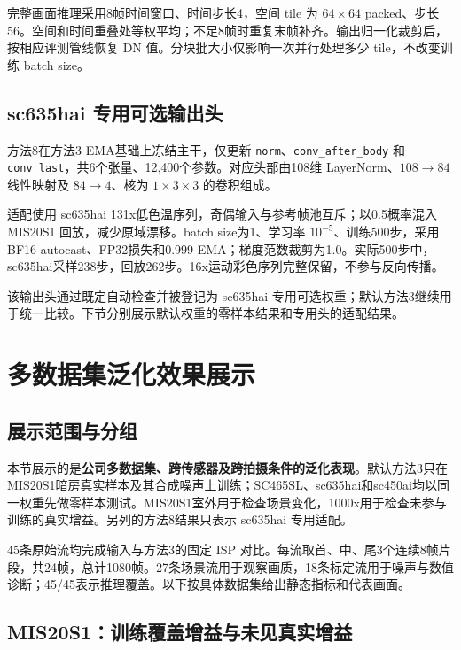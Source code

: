 \documentclass[11pt,a4paper,UTF8,fontset=fandol]{ctexart}
\begin{document}
完整画面推理采用8帧时间窗口、时间步长4，空间 tile 为 $64\times64$ packed、步长56。空间和时间重叠处等权平均；不足8帧时重复末帧补齐。输出归一化裁剪后，按相应评测管线恢复 DN 值。分块批大小仅影响一次并行处理多少 tile，不改变训练 batch size。

\subsection{sc635hai 专用可选输出头}
\label{sec:head}

方法8在方法3 EMA基础上冻结主干，仅更新 \texttt{norm}、\texttt{conv\_after\_body} 和 \texttt{conv\_last}，共6个张量、12,400个参数。对应头部由108维 LayerNorm、$108\rightarrow84$线性映射及 $84\rightarrow4$、核为 $1\times3\times3$ 的卷积组成。

适配使用 sc635hai 131x低色温序列，奇偶输入与参考帧池互斥；以0.5概率混入 MIS20S1 回放，减少原域漂移。batch size为1、学习率 $10^{-5}$、训练500步，采用BF16 autocast、FP32损失和0.999 EMA；梯度范数裁剪为1.0。实际500步中，sc635hai采样238步，回放262步。16x运动彩色序列完整保留，不参与反向传播。

该输出头通过既定自动检查并被登记为 sc635hai 专用可选权重；默认方法3继续用于统一比较。下节分别展示默认权重的零样本结果和专用头的适配结果。

\section{多数据集泛化效果展示}
\label{sec:results}

\subsection{展示范围与分组}

本节展示的是\textbf{公司多数据集、跨传感器及跨拍摄条件的泛化表现}。默认方法3只在 MIS20S1暗房真实样本及其合成噪声上训练；SC465SL、sc635hai和sc450ai均以同一权重先做零样本测试。MIS20S1室外用于检查场景变化，1000x用于检查未参与训练的真实增益。另列的方法8结果只表示 sc635hai 专用适配。

45条原始流均完成输入与方法3的固定 ISP 对比。每流取首、中、尾3个连续8帧片段，共24帧，总计1080帧。27条场景流用于观察画质，18条标定流用于噪声与数值诊断；45/45表示推理覆盖。以下按具体数据集给出静态指标和代表画面。

\subsection{MIS20S1：训练覆盖增益与未见真实增益}
\end{document}
